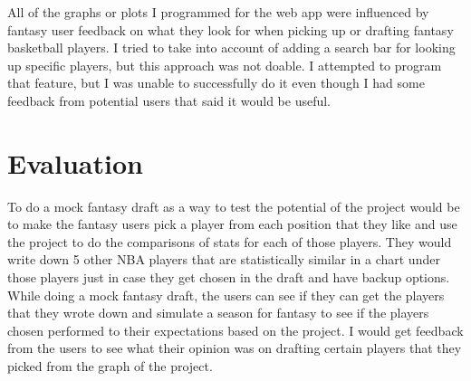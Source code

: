 \documentclass[10pt,twocolumn]{article}
\begin{document}
All of the graphs or plots I programmed for the web app were influenced by fantasy user feedback on what they look for when picking up or drafting fantasy basketball players. I tried to take into account of adding a search bar for looking up specific players, but this approach was not doable. I attempted to program that feature, but I was unable to successfully do it even though I had some feedback from potential users that said it would be useful. 


\section{Evaluation}

To do a mock fantasy draft as a way to test the potential of the project would be to make the fantasy users pick a player from each position that they like and use the project to do the comparisons of stats for each of those players. They would write down 5 other NBA players that are statistically similar in a chart under those players just in case they get chosen in the draft and have backup options. While doing a mock fantasy draft, the users can see if they can get the players that they wrote down and simulate a season for fantasy to see if the players chosen performed to their expectations based on the project. I would get feedback from the users to see what their opinion was on drafting certain players that they picked from the graph of the project.  
\end{document}
